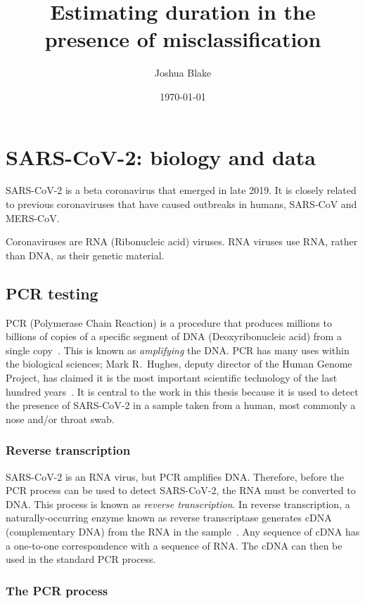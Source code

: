 \documentclass[thesis.tex]{subfiles}
\title{Estimating duration in the presence of misclassification}
\author{Joshua Blake}
\date{\today}
\begin{document}
\ifSubfilesClassLoaded{
  \setcounter{chapter}{1}
}

\chapter{SARS-CoV-2: biology and data} \label{biology-data}


SARS-CoV-2 is a beta coronavirus that emerged in late 2019.
It is closely related to previous coronaviruses that have caused outbreaks in humans, SARS-CoV and MERS-CoV.

Coronaviruses are RNA (Ribonucleic acid) viruses.
RNA viruses use RNA, rather than DNA, as their genetic material.


\section{PCR testing} \label{biology-data:sec:PCR}

PCR (Polymerase Chain Reaction) is a procedure that produces millions to billions of copies of a specific segment of DNA (Deoxyribonucleic acid) from a single copy~\autocite{smithPCR,garibyanPCR}.
This is known as \emph{amplifying} the DNA.
PCR has many uses within the biological sciences; Mark R.\ Hughes, deputy director of the Human Genome Project, has claimed it is the most important scientific technology of the last hundred years~\autocite{powledgePCR}.
It is central to the work in this thesis because it is used to detect the presence of SARS-CoV-2 in a sample taken from a human, most commonly a nose and/or throat swab.

\subsection{Reverse transcription}

SARS-CoV-2 is an RNA virus, but PCR amplifies DNA.
Therefore, before the PCR process can be used to detect SARS-CoV-2, the RNA must be converted to DNA.
This process is known as \emph{reverse transcription}.
In reverse transcription, a naturally-occurring enzyme known as reverse transcriptase generates cDNA (complementary DNA) from the RNA in the sample~\autocite{valasekPower}.
Any sequence of cDNA has a one-to-one correspondence with a sequence of RNA.
The cDNA can then be used in the standard PCR process.

\subsection{The PCR process} \label{biology-data:sec:PCR-process}
\end{document}
